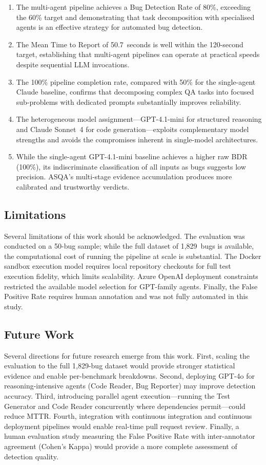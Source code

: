 \documentclass[conference]{IEEEtran}
\begin{document}
\begin{enumerate}
    \item The multi-agent pipeline achieves a Bug Detection Rate of 80\%, exceeding the 60\% target and demonstrating that task decomposition with specialised agents is an effective strategy for automated bug detection.
    \item The Mean Time to Report of 50.7~seconds is well within the 120-second target, establishing that multi-agent pipelines can operate at practical speeds despite sequential LLM invocations.
    \item The 100\% pipeline completion rate, compared with 50\% for the single-agent Claude baseline, confirms that decomposing complex QA tasks into focused sub-problems with dedicated prompts substantially improves reliability.
    \item The heterogeneous model assignment---GPT-4.1-mini for structured reasoning and Claude Sonnet~4 for code generation---exploits complementary model strengths and avoids the compromises inherent in single-model architectures.
    \item While the single-agent GPT-4.1-mini baseline achieves a higher raw BDR (100\%), its indiscriminate classification of all inputs as bugs suggests low precision. ASQA's multi-stage evidence accumulation produces more calibrated and trustworthy verdicts.
\end{enumerate}

\subsection{Limitations}

Several limitations of this work should be acknowledged. The evaluation was conducted on a 50-bug sample; while the full dataset of 1,829~bugs is available, the computational cost of running the pipeline at scale is substantial. The Docker sandbox execution model requires local repository checkouts for full test execution fidelity, which limits scalability. Azure OpenAI deployment constraints restricted the available model selection for GPT-family agents. Finally, the False Positive Rate requires human annotation and was not fully automated in this study.

\subsection{Future Work}

Several directions for future research emerge from this work. First, scaling the evaluation to the full 1,829-bug dataset would provide stronger statistical evidence and enable per-benchmark breakdowns. Second, deploying GPT-4o for reasoning-intensive agents (Code Reader, Bug Reporter) may improve detection accuracy. Third, introducing parallel agent execution---running the Test Generator and Code Reader concurrently where dependencies permit---could reduce MTTR. Fourth, integration with continuous integration and continuous deployment pipelines would enable real-time pull request review. Finally, a human evaluation study measuring the False Positive Rate with inter-annotator agreement (Cohen's Kappa) would provide a more complete assessment of detection quality.
\end{document}
